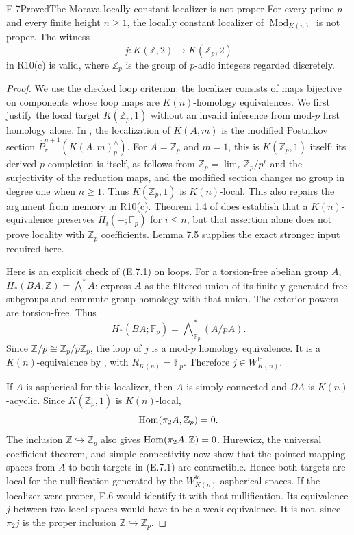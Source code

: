 \begin{claim}{E.7}{Proved}{The Morava locally constant localizer is not proper}
For every prime $p$ and every finite height $n\geq1$, the
locally constant localizer of $\operatorname{Mod}_{K(n)}$
is not proper. The witness
\[
 j:K(\mathbb Z,2)\longrightarrow K(\mathbb Z_p,2)          \tag{E.7.1}
\]
in R10(c) is valid, where $\mathbb Z_p$ is the group
of $p$-adic integers regarded discretely.
\end{claim}
\begin{proof}
We use the checked loop criterion: the localizer consists
of maps bijective on components whose loop maps are
$K(n)$-homology equivalences. We first justify the
local target $K(\mathbb Z_p,1)$ without an invalid
inference from mod-$p$ first homology alone.
In \citet[Lemma 7.5]{EH5Bousfield2001}, the localization of
$K(A,m)$ is the modified Postnikov section
$\widehat P^{n+1}_{\tau}(K(A,m)^{\wedge}_p)$.
For $A=\mathbb Z_p$ and $m=1$, this is $K(\mathbb Z_p,1)$
itself: its derived $p$-completion is itself, as follows from
$\mathbb Z_p=\lim_r\mathbb Z_p/p^r$ and the surjectivity of
the reduction maps, and the modified section changes no
group in degree one when $n\geq1$.
Thus $K(\mathbb Z_p,1)$ is $K(n)$-local.
This also repairs the argument from memory in R10(c).
Theorem 1.4 of \citet{EH5BousfieldKn} does establish that a
$K(n)$-equivalence preserves $H_i(-;\mathbb F_p)$ for $i\leq n$,
but that assertion alone does not prove locality with
$\mathbb Z_p$ coefficients. Lemma 7.5 supplies the exact stronger
input required here.

Here is an explicit check of (E.7.1) on loops.
For a torsion-free abelian group $A$,
$H_*(BA;\mathbb Z)=\bigwedge^*A$: express $A$ as
the filtered union of its finitely generated free
subgroups and commute group homology with that union.
The exterior powers are torsion-free. Thus
\[
 H_*(BA;\mathbb F_p)=
             \bigwedge\nolimits_{\mathbb F_p}^*(A/pA).
\]
Since $\mathbb Z/p\cong\mathbb Z_p/p\mathbb Z_p$,
the loop of $j$ is a mod-$p$ homology equivalence.
It is a $K(n)$-equivalence by
\citet[Lemma 10.6]{EH5Bousfield1997}, with
$R_{K(n)}=\mathbb F_p$. Therefore $j\in W^{\mathrm{lc}}_{K(n)}$.

If $A$ is aspherical for this localizer, then
$A$ is simply connected and $\Omega A$ is
$K(n)$-acyclic. Since $K(\mathbb Z_p,1)$ is
$K(n)$-local,
\[
 \operatorname{Hom}(\pi_2A,\mathbb Z_p)=0.
\]
The inclusion $\mathbb Z\hookrightarrow\mathbb Z_p$
also gives $\operatorname{Hom}(\pi_2A,\mathbb Z)=0$. Hurewicz,
the universal coefficient theorem, and simple
connectivity now show that the pointed mapping
spaces from $A$ to both targets in (E.7.1) are
contractible. Hence both targets are local for
the nullification generated by the
$W^{\mathrm{lc}}_{K(n)}$-aspherical spaces.
If the localizer were proper, E.6 would identify
it with that nullification. Its equivalence
$j$ between two local spaces would have to be
a weak equivalence. It is not, since
$\pi_2j$ is the proper inclusion
$\mathbb Z\hookrightarrow\mathbb Z_p$.
\end{proof}

